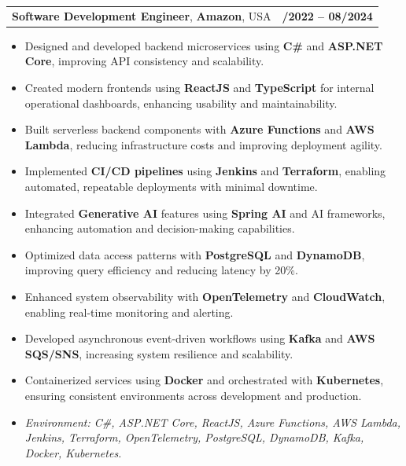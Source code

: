 \documentclass[letterpaper,11pt]{article}
\makeatletter
\newcommand{\resumeItem}[1]{
  \item\footnotesize{
    {#1 \vspace{-2pt}}
  }
}
\newcommand{\resumeSubheading}[4]{
  \vspace{-2pt}\item
    \begin{tabular*}{1.0\textwidth}[t]{l@{\extracolsep{\fill}}r}
      \textbf{\fontsize{10pt}{14pt}\selectfont #3}, \textbf{\fontsize{10pt}{14pt}\selectfont #1}, \fontsize{10pt}{14pt}\selectfont #4 & \textbf{\fontsize{10pt}{14pt}\selectfont #2} \\
    \end{tabular*}\vspace{-7pt}
}
\newcommand{\resumeItemListStart}{\begin{itemize}[leftmargin=*]}
\newcommand{\resumeItemListEnd}{\end{itemize}\vspace{-5pt}}
\makeatother
\begin{document}
\resumeSubheading
{Amazon}{10/2022 -- 08/2024}
{Software Development Engineer}{USA}
\resumeItemListStart
  \resumeItem{Designed and developed backend microservices using \textbf{C\#} and \textbf{ASP.NET Core}, improving API consistency and scalability.}
  \resumeItem{Created modern frontends using \textbf{ReactJS} and \textbf{TypeScript} for internal operational dashboards, enhancing usability and maintainability.}
  \resumeItem{Built serverless backend components with \textbf{Azure Functions} and \textbf{AWS Lambda}, reducing infrastructure costs and improving deployment agility.}
  \resumeItem{Implemented \textbf{CI/CD pipelines} using \textbf{Jenkins} and \textbf{Terraform}, enabling automated, repeatable deployments with minimal downtime.}
  \resumeItem{Integrated \textbf{Generative AI} features using \textbf{Spring AI} and AI frameworks, enhancing automation and decision-making capabilities.}
  \resumeItem{Optimized data access patterns with \textbf{PostgreSQL} and \textbf{DynamoDB}, improving query efficiency and reducing latency by 20\%.}
  \resumeItem{Enhanced system observability with \textbf{OpenTelemetry} and \textbf{CloudWatch}, enabling real-time monitoring and alerting.}
  \resumeItem{Developed asynchronous event-driven workflows using \textbf{Kafka} and \textbf{AWS SQS/SNS}, increasing system resilience and scalability.}
  \resumeItem{Containerized services using \textbf{Docker} and orchestrated with \textbf{Kubernetes}, ensuring consistent environments across development and production.}
  \resumeItem{\textit{Environment: C\#, ASP.NET Core, ReactJS, Azure Functions, AWS Lambda, Jenkins, Terraform, OpenTelemetry, PostgreSQL, DynamoDB, Kafka, Docker, Kubernetes.}}
\resumeItemListEnd
\end{document}
